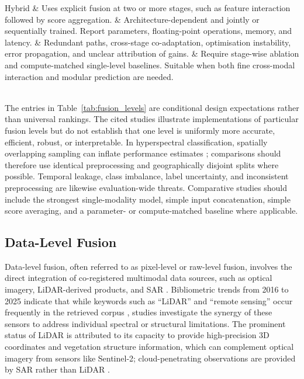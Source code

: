 \documentclass[]{interact}
\theoremstyle{plain}%
\theoremstyle{definition}
\theoremstyle{remark}
\begin{document}
\begin{table}[!htbp]
\begin{tabular}
		\addlinespace[2pt]
		Hybrid & Uses explicit fusion at two or more stages, such as feature interaction followed by score aggregation. & Architecture-dependent and jointly or sequentially trained. Report parameters, floating-point operations, memory, and latency. & Redundant paths, cross-stage co-adaptation, optimisation instability, error propagation, and unclear attribution of gains. & Require stage-wise ablation and compute-matched single-level baselines. Suitable when both fine cross-modal interaction and modular prediction are needed. \\
		\midrule
		 \\
		\bottomrule
	\end{tabular}
\end{table}

The entries in Table~\ref{tab:fusion_levels} are conditional design expectations rather than universal rankings. The cited studies illustrate implementations of particular fusion levels but do not establish that one level is uniformly more accurate, efficient, robust, or interpretable. In hyperspectral classification, spatially overlapping sampling can inflate performance estimates \citep{liang2017sampling}; comparisons should therefore use identical preprocessing and geographically disjoint splits where possible. Temporal leakage, class imbalance, label uncertainty, and inconsistent preprocessing are likewise evaluation-wide threats. Comparative studies should include the strongest single-modality model, simple input concatenation, simple score averaging, and a parameter- or compute-matched baseline where applicable.

\FloatBarrier

\subsection{Data-Level Fusion}
Data-level fusion, often referred to as pixel-level or raw-level fusion, involves the direct integration of co-registered multimodal data sources, such as optical imagery, LiDAR-derived products, and SAR \citep{57}. Bibliometric trends from 2016 to 2025 indicate that while keywords such as ``LiDAR'' and ``remote sensing'' occur frequently in the retrieved corpus \citep{38, 39}, studies investigate the synergy of these sensors to address individual spectral or structural limitations. The prominent status of LiDAR is attributed to its capacity to provide high-precision 3D coordinates and vegetation structure information, which can complement optical imagery from sensors like Sentinel-2; cloud-penetrating observations are provided by SAR rather than LiDAR \citep{40}.
\end{document}
